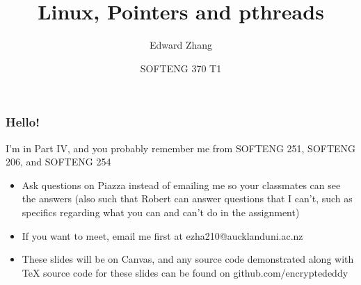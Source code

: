 \documentclass{beamer}
\title[SOFTENG 370 Tutorial 1 (2019)] %
{Linux, Pointers and pthreads}
\author{Edward Zhang}
\date[July 2019] %
{SOFTENG 370 T1}
\begin{document}
\frame{\titlepage}
\begin{frame}
  \frametitle{Hello!}
  I'm in Part IV, and you probably remember me from SOFTENG 251, SOFTENG 206, and SOFTENG 254\\
  \begin{itemize}
    \item Ask questions on Piazza instead of emailing me so your classmates can see the answers (also such that Robert can answer questions that I can't, such as specifics regarding what you can and can't do in the assignment)
    \item If you want to meet, email me first at ezha210@aucklanduni.ac.nz
    \item These slides will be on Canvas, and any source code demonstrated along with TeX source code for these slides can be found on github.com/encryptededdy
  \end{itemize}
\end{frame}
\end{document}
